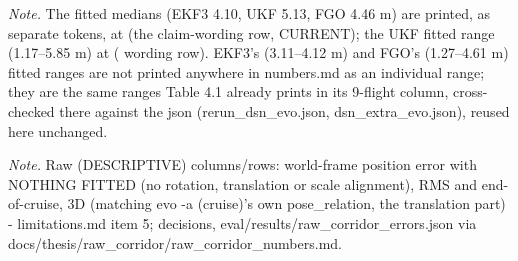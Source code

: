 \begin{table}[htbp]
\textit{Note.} The fitted medians (EKF3 4.10, UKF 5.13, FGO 4.46 m) are printed, as separate tokens, at (the claim-wording row, CURRENT); the UKF fitted range (1.17--5.85 m) at ( wording row). EKF3's (3.11--4.12 m) and FGO's (1.27--4.61 m) fitted ranges are not printed anywhere in numbers.md as an individual range; they are the same ranges Table 4.1 already prints in its 9-flight column, cross-checked there against the json (rerun\_dsn\_evo.json, dsn\_extra\_evo.json), reused here unchanged.\par
\textit{Note.} Raw (DESCRIPTIVE) columns/rows: world-frame position error with NOTHING FITTED (no rotation, translation or scale alignment), RMS and end-of-cruise, 3D (matching evo -a (cruise)'s own pose\_relation, the translation part) - limitations.md item 5; decisions, eval/results/raw\_corridor\_errors.json via docs/thesis/raw\_corridor/raw\_corridor\_numbers.md.\par
\end{table}
